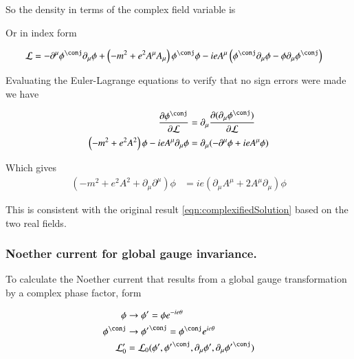 \documentclass{article}
\begin{document}

So the density in terms of the complex field variable is 

%
Or in index form

\begin{align}\label{eqn:densityComplex}
\LL 
&=
-\partial^\mu \phi^\conj \partial_\mu \phi
+ \left( -m^2 + e^2 A^\mu A_\mu \right) \phi^\conj \phi
- i e A^\mu \left( \phi^\conj \partial_\mu \phi - \phi \partial_\mu \phi^\conj \right)
\end{align}

Evaluating the Euler-Lagrange equations to verify that no sign errors were made we have

\begin{align*}
\PD{\phi^\conj}{\LL}
&=
\partial_\mu \PD{(\partial_\mu \phi^\conj)}{\LL} \\
\left( -m^2 + e^2 A^2 \right) \phi 
- i e A^\mu \partial_\mu \phi
&=
\partial_\mu (-\partial^\mu \phi + i e A^\mu \phi) \\
\end{align*}

Which gives
\begin{align}
\left( -m^2 + e^2 A^2 + \partial_\mu \partial^\mu \right) \phi &= i e (\partial_\mu A^\mu + 2 A^\mu \partial_\mu) \phi
\end{align}

This is consistent with the original result \ref{eqn:complexifiedSolution} based on the two real fields.

\subsubsection{ Noether current for global gauge invariance. }

To calculate the Noether current that results from a global gauge transformation by a complex phase factor, form

\begin{align*}
\phi &\rightarrow \phi' = \phi e^{-i e \theta} \\
\phi^\conj &\rightarrow {\phi'}^\conj = \phi^\conj e^{i e \theta} \\
\LL_0' &= \LL_0( \phi', {\phi'}^\conj, \partial_\mu \phi', \partial_\mu {\phi'}^\conj )
\end{align*}
\end{document}
